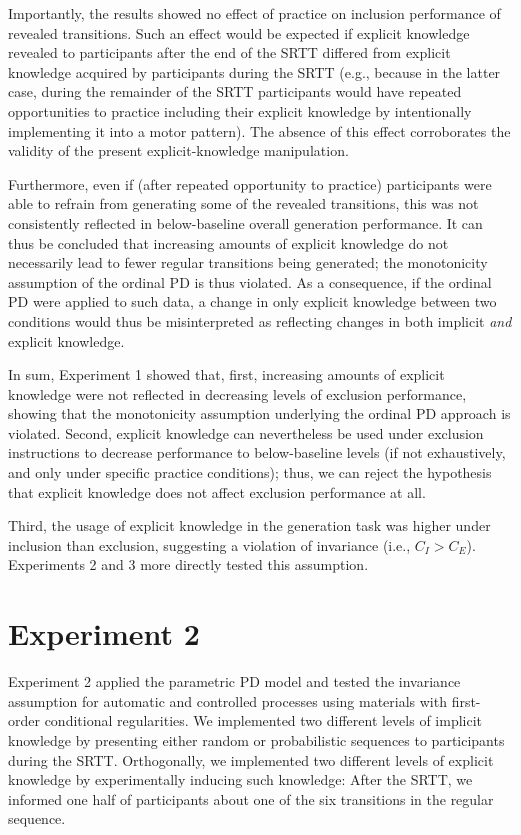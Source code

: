 \documentclass[floatsintext,doc]{apa6}
\theoremstyle{definition}
\theoremstyle{definition}
\theoremstyle{definition}
\theoremstyle{remark}
\begin{document}
Importantly, the results showed no effect of practice on inclusion
performance of revealed transitions. Such an effect would be expected if
explicit knowledge revealed to participants after the end of the SRTT
differed from explicit knowledge acquired by participants during the
SRTT (e.g., because in the latter case, during the remainder of the SRTT
participants would have repeated opportunities to practice including
their explicit knowledge by intentionally implementing it into a motor
pattern). The absence of this effect corroborates the validity of the
present explicit-knowledge manipulation.

Furthermore, even if (after repeated opportunity to practice)
participants were able to refrain from generating some of the revealed
transitions, this was not consistently reflected in below-baseline
overall generation performance. It can thus be concluded that increasing
amounts of explicit knowledge do not necessarily lead to fewer regular
transitions being generated; the monotonicity assumption of the ordinal
PD is thus violated. As a consequence, if the ordinal PD were applied to
such data, a change in only explicit knowledge between two conditions
would thus be misinterpreted as reflecting changes in both implicit
\emph{and} explicit knowledge.

In sum, Experiment 1 showed that, first, increasing amounts of explicit
knowledge were not reflected in decreasing levels of exclusion
performance, showing that the monotonicity assumption underlying the
ordinal PD approach is violated. Second, explicit knowledge can
nevertheless be used under exclusion instructions to decrease
performance to below-baseline levels (if not exhaustively, and only
under specific practice conditions); thus, we can reject the hypothesis
that explicit knowledge does not affect exclusion performance at all.

Third, the usage of explicit knowledge in the generation task was higher
under inclusion than exclusion, suggesting a violation of invariance
(i.e., \(C_{I} > C_{E}\)). Experiments 2 and 3 more directly tested this
assumption.

\section{Experiment 2}\label{experiment-2}

Experiment 2 applied the parametric PD model and tested the invariance
assumption for automatic and controlled processes using materials with
first-order conditional regularities. We implemented two different
levels of implicit knowledge by presenting either random or
probabilistic sequences to participants during the SRTT. Orthogonally,
we implemented two different levels of explicit knowledge by
experimentally inducing such knowledge: After the SRTT, we informed one
half of participants about one of the six transitions in the regular
sequence.
\end{document}
